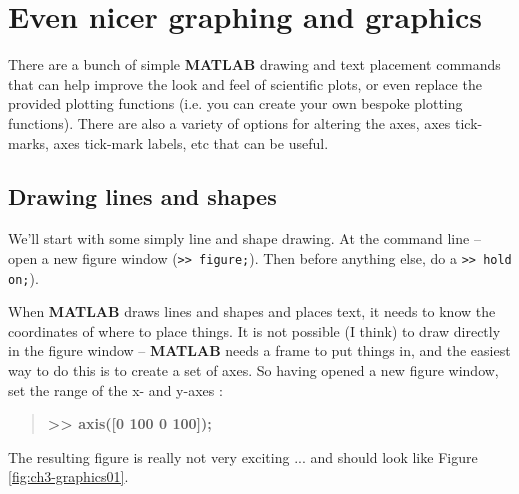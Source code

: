 \documentclass{tufte-book} %
\newenvironment{docspecbold}{\begin{quotation}\ttfamily\bfseries\parskip0pt\parindent0pt\ignorespaces}{\end{quotation}}
\begin{document}

\newpage


\section{Even nicer graphing and graphics}

There are a bunch of simple \textbf{MATLAB} drawing and text placement commands that can help improve the look and feel of scientific plots, or even replace the provided plotting functions (i.e. you can create your own bespoke plotting functions). There are also a variety of options for altering the axes, axes tick-marks, axes tick-mark labels, etc that can be useful.


\newpage


\subsection{Drawing lines and shapes}

We'll start with some simply line and shape drawing. At the command line -- open a new \textsf{figure window} (\texttt{>> figure;}). Then before anything else, do a \texttt{>> hold on;}).

When \textbf{MATLAB} draws lines and shapes and places text, it needs to know the coordinates of where to place things. It is not possible (I think) to draw directly in the \textsf{figure window} -- \textbf{MATLAB} needs a frame to put things in, and the easiest way to do this is to create a set of axes. So having opened a new \textsf{figure window}, set the range of the x- and y-axes
:

\begin{docspecbold}
>> axis([0 100 0 100]);
\end{docspecbold}

\noindent The resulting figure is really not very exciting ... and should look like Figure \ref{fig:ch3-graphics01}.
\end{document}
